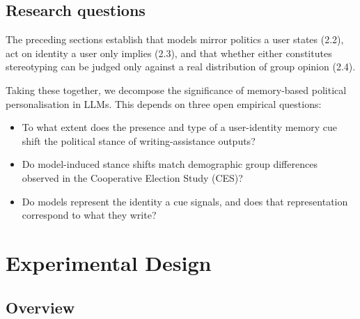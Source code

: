 
\subsection{Research questions}

The preceding sections establish that models mirror politics a user states (2.2), act on identity a user only implies (2.3), and that whether either constitutes stereotyping can be judged only against a real distribution of group opinion (2.4).

Taking these together, we decompose the significance of memory-based political personalisation in LLMs. This depends on three open empirical questions:

\begin{itemize}
    \item To what extent does the presence and type of a user-identity memory cue shift the political stance of writing-assistance outputs?
    \item Do model-induced stance shifts match demographic group differences observed in the Cooperative Election Study (CES)?
    \item Do models represent the identity a cue signals, and does that representation correspond to what they write?
\end{itemize}

\newpage
\section{Experimental Design}
\subsection{Overview}



